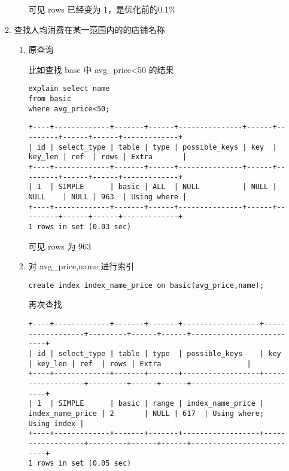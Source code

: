 \documentclass[11pt]{article}
\begin{document}
\begin{itemize}
\begin{enumerate}
\begin{enumerate}
可见 rows 已经变为 1，是优化前的0.1\%
\end{enumerate}
\item 查找人均消费在某一范围内的的店铺名称
\begin{enumerate}
\item 原查询

比如查找 base 中 avg\_price<50 的结果

\begin{lstlisting}
explain select name
from basic
where avg_price<50;
\end{lstlisting}

\begin{verbatim}
+----+-------------+-------+------+---------------+------+---------+------+------+-------------+
| id | select_type | table | type | possible_keys | key  | key_len | ref  | rows | Extra       |
+----+-------------+-------+------+---------------+------+---------+------+------+-------------+
| 1  | SIMPLE      | basic | ALL  | NULL          | NULL | NULL    | NULL | 963  | Using where |
+----+-------------+-------+------+---------------+------+---------+------+------+-------------+
1 rows in set (0.03 sec)
\end{verbatim}

可见 rows 为 963

\item 对 avg\_price,name 进行索引

\begin{lstlisting}
create index index_name_price on basic(avg_price,name);
\end{lstlisting}

再次查找

\begin{verbatim}
+----+-------------+-------+-------+------------------+------------------+---------+------+------+--------------------------+
| id | select_type | table | type  | possible_keys    | key              | key_len | ref  | rows | Extra                    |
+----+-------------+-------+-------+------------------+------------------+---------+------+------+--------------------------+
| 1  | SIMPLE      | basic | range | index_name_price | index_name_price | 2       | NULL | 617  | Using where; Using index |
+----+-------------+-------+-------+------------------+------------------+---------+------+------+--------------------------+
1 rows in set (0.05 sec)
\end{verbatim}


\end{enumerate}
\end{enumerate}
\end{itemize}
\end{document}
